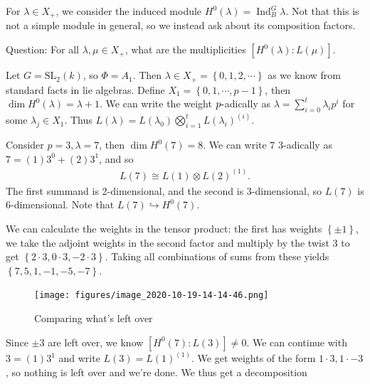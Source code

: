 For \(\lambda \in X_+\), we consider the induced module
\(H^0(\lambda) = \operatorname{Ind}_B^G \lambda\). Not that this is not
a simple module in general, so we instead ask about its composition
factors.

Question: For all \(\lambda, \mu \in X_+\), what are the multiplicities
\([H^0(\lambda): L(\mu)]\).

\begin{example}

\begin{example}

Let \(G = {\text{SL}}_2(k)\), so \(\Phi = A_1\). Then
\(\lambda \in X_+ = \left\{{0,1,2,\cdots}\right\}\) as we know from
standard facts in lie algebras. Define
\(X_1 = \left\{{0, 1, \cdots, p-1}\right\}\), then
\(\dim H^0(\lambda) = \lambda + 1\). We can write the weight
\(p{\hbox{-}}\)adically as \(\lambda = \sum_{i=0}^t \lambda_i p^i\) for
some \(\lambda_j\in X_1\). Thus
\(L(\lambda) = L(\lambda_0) \bigotimes_{i=1}^t L(\lambda_i)^{(i)}\).

Consider \(p=3, \lambda = 7\), then \(\dim H^0(7) = 8\). We can write
\(7\) 3-adically as \(7 = (1)3^0 + (2)3^1\), and so
\begin{align*}   L(7) \cong L(1) \otimes L(2)^{(1)} .\end{align*} The
first summand is 2-dimensional, and the second is 3-dimensional, so
\(L(7)\) is 6-dimensional. Note that \(L(7) \hookrightarrow H^0(7)\).

We can calculate the weights in the tensor product: the first has
weights \(\left\{{\pm 1}\right\}\), we take the adjoint weights in the
second factor and multiply by the twist 3 to get
\(\left\{{2\cdot 3, 0\cdot 3, -2\cdot 3}\right\}\). Taking all
combinations of sums from these yields
\(\left\{{7,5,1,-1,-5,-7}\right\}\).

\begin{figure}
\centering
\texttt{[image: figures/image\_2020-10-19-14-14-46.png]}
\caption{Comparing what's left over}
\end{figure}

Since \(\pm 3\) are left over, we know \([H^0(7): L(3)] \neq 0\). We can
continue with \(3 = (1)3^1\) and write \(L(3) = L(1)^{(1)}\). We get
weights of the form \(1\cdot 3, 1\cdot -3\), so nothing is left over and
we're done. We thus get a decomposition

\begin{center}
\end{center}


\end{example}
\end{example}

